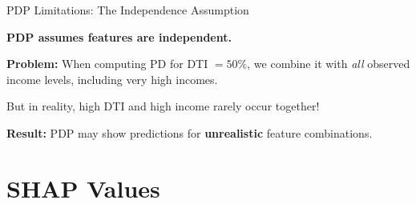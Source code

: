 \documentclass[10pt]{beamer}
\newcommand{\highlight}[1]{\textcolor{AccentOrange}{\textbf{#1}}}
\begin{document}

\begin{frame}{PDP Limitations: The Independence Assumption}

  \textbf{PDP assumes features are independent.}

  \vspace{0.5em}
  \textbf{Problem:} When computing PD for DTI $= 50\%$, we combine it with \emph{all} observed income levels, including very high incomes.

  \vspace{0.5em}
  But in reality, high DTI and high income rarely occur together!

  \vspace{1em}
  \begin{center}
  \end{center}

  \vspace{0.3em}
  \textbf{Result:} PDP may show predictions for \highlight{unrealistic} feature combinations.
\end{frame}

\section{SHAP Values}
\end{document}
